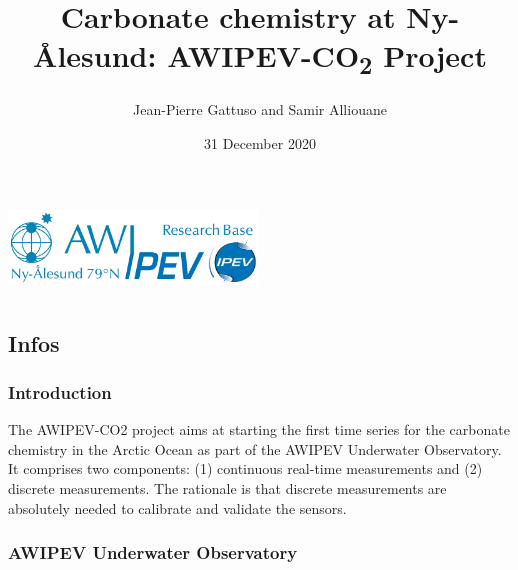 \documentclass[
]{article}
\title{Carbonate chemistry at Ny-Ålesund: AWIPEV-CO\textsubscript{2}
Project}
\author{Jean-Pierre Gattuso and Samir Alliouane}
\date{31 December 2020}
\begin{document}
\maketitle

\includegraphics[width=2.60417in,height=\textheight]{Images/AWIPEV-Logo.jpg}

\hypertarget{section}{%
\section{}\label{section}}

\hypertarget{infos}{%
\subsection{Infos}\label{infos}}

\hypertarget{introduction}{%
\subsubsection{\texorpdfstring{\textbf{Introduction}}{Introduction}}\label{introduction}}

The AWIPEV-CO2 project aims at starting the first time series for the
carbonate chemistry in the Arctic Ocean as part of the AWIPEV Underwater
Observatory. It comprises two components: (1) continuous real-time
measurements and (2) discrete measurements. The rationale is that
discrete measurements are absolutely needed to calibrate and validate
the sensors.

\hypertarget{awipev-underwater-observatory}{%
\subsubsection{\texorpdfstring{\textbf{AWIPEV Underwater
Observatory}}{AWIPEV Underwater Observatory}}\label{awipev-underwater-observatory}}
\end{document}
